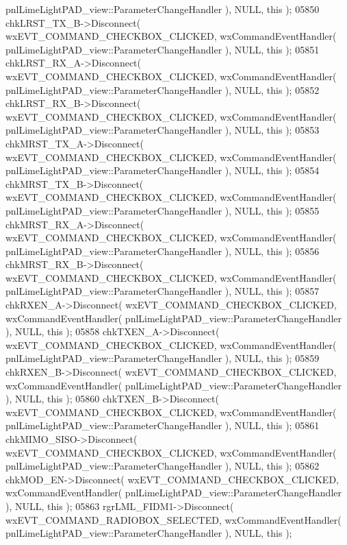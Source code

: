 \begin{DoxyCode}
      pnlLimeLightPAD_view::ParameterChangeHandler ), NULL, \textcolor{keyword}{this} );
05850     chkLRST_TX_B->Disconnect( wxEVT\_COMMAND\_CHECKBOX\_CLICKED, wxCommandEventHandler( 
      pnlLimeLightPAD_view::ParameterChangeHandler ), NULL, \textcolor{keyword}{this} );
05851     chkLRST_RX_A->Disconnect( wxEVT\_COMMAND\_CHECKBOX\_CLICKED, wxCommandEventHandler( 
      pnlLimeLightPAD_view::ParameterChangeHandler ), NULL, \textcolor{keyword}{this} );
05852     chkLRST_RX_B->Disconnect( wxEVT\_COMMAND\_CHECKBOX\_CLICKED, wxCommandEventHandler( 
      pnlLimeLightPAD_view::ParameterChangeHandler ), NULL, \textcolor{keyword}{this} );
05853     chkMRST_TX_A->Disconnect( wxEVT\_COMMAND\_CHECKBOX\_CLICKED, wxCommandEventHandler( 
      pnlLimeLightPAD_view::ParameterChangeHandler ), NULL, \textcolor{keyword}{this} );
05854     chkMRST_TX_B->Disconnect( wxEVT\_COMMAND\_CHECKBOX\_CLICKED, wxCommandEventHandler( 
      pnlLimeLightPAD_view::ParameterChangeHandler ), NULL, \textcolor{keyword}{this} );
05855     chkMRST_RX_A->Disconnect( wxEVT\_COMMAND\_CHECKBOX\_CLICKED, wxCommandEventHandler( 
      pnlLimeLightPAD_view::ParameterChangeHandler ), NULL, \textcolor{keyword}{this} );
05856     chkMRST_RX_B->Disconnect( wxEVT\_COMMAND\_CHECKBOX\_CLICKED, wxCommandEventHandler( 
      pnlLimeLightPAD_view::ParameterChangeHandler ), NULL, \textcolor{keyword}{this} );
05857     chkRXEN_A->Disconnect( wxEVT\_COMMAND\_CHECKBOX\_CLICKED, wxCommandEventHandler( 
      pnlLimeLightPAD_view::ParameterChangeHandler ), NULL, \textcolor{keyword}{this} );
05858     chkTXEN_A->Disconnect( wxEVT\_COMMAND\_CHECKBOX\_CLICKED, wxCommandEventHandler( 
      pnlLimeLightPAD_view::ParameterChangeHandler ), NULL, \textcolor{keyword}{this} );
05859     chkRXEN_B->Disconnect( wxEVT\_COMMAND\_CHECKBOX\_CLICKED, wxCommandEventHandler( 
      pnlLimeLightPAD_view::ParameterChangeHandler ), NULL, \textcolor{keyword}{this} );
05860     chkTXEN_B->Disconnect( wxEVT\_COMMAND\_CHECKBOX\_CLICKED, wxCommandEventHandler( 
      pnlLimeLightPAD_view::ParameterChangeHandler ), NULL, \textcolor{keyword}{this} );
05861     chkMIMO_SISO->Disconnect( wxEVT\_COMMAND\_CHECKBOX\_CLICKED, wxCommandEventHandler( 
      pnlLimeLightPAD_view::ParameterChangeHandler ), NULL, \textcolor{keyword}{this} );
05862     chkMOD_EN->Disconnect( wxEVT\_COMMAND\_CHECKBOX\_CLICKED, wxCommandEventHandler( 
      pnlLimeLightPAD_view::ParameterChangeHandler ), NULL, \textcolor{keyword}{this} );
05863     rgrLML_FIDM1->Disconnect( wxEVT\_COMMAND\_RADIOBOX\_SELECTED, wxCommandEventHandler( 
      pnlLimeLightPAD_view::ParameterChangeHandler ), NULL, \textcolor{keyword}{this} );

\end{DoxyCode}
